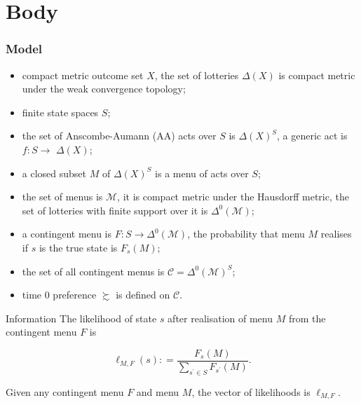 \documentclass[usenames,dvipsnames,aspectratio=169,11pt, envcountsect]{beamer}
\begin{document}
\section{Body}

\begin{frame}\frametitle{Model}
	\begin{itemize}
		\item
		      compact metric outcome set \(X\), the set of lotteries \(\Delta \left( X \right)\) is compact metric under the weak convergence topology; \pause
		\item
		      finite state spaces \(S\); \pause
		\item
		      the set of Anscombe-Aumann (AA) acts over \(S\) is \(\Delta \left( X \right)^{S}\), a generic act is \(f: S \longrightarrow\) \(\Delta(X)\); \pause
		\item
		      a closed subset \(M\) of \(\Delta \left( X \right)^{S}\) is a menu of acts over \(S\); \pause
		\item
		      the set of menus is \(\mathcal{M}\), it is compact metric under the Hausdorff metric, the set of lotteries with finite support over it is \(\Delta^{0} \left( \mathcal{M} \right)\); \pause
		\item
		      a contingent menu is \(F: S \rightarrow \Delta^{0} \left( \mathcal{M} \right) \), the probability that menu \( M \) realises if \(s\) is the true state is \(F_{s} \left( M \right) \); \pause
		\item
		      the set of all contingent menus is \(\mathcal{C}= \Delta^{0} \left( \mathcal{M} \right)^S \); \pause
		\item
		      time \(0\) preference \(\succsim\) is defined on \( \mathcal{C} \).
	\end{itemize}
\end{frame}

\begin{frame}{Information}
	The likelihood of state \(s\) after realisation of menu \(M\) from the contingent menu \(F\) is

	\vfill

	\[ \ell_{M, F} \left( s \right) : = \frac{F_{s} \left( M \right)}{ \sum_{s^{\prime} \in S} F_{s^{\prime}} \left( M \right)} .
	\]

	\vfill

	Given any contingent menu \(F\) and menu \(M\), the vector of likelihoods is \(\ell_{M, F}\).
\end{frame}
\end{document}
